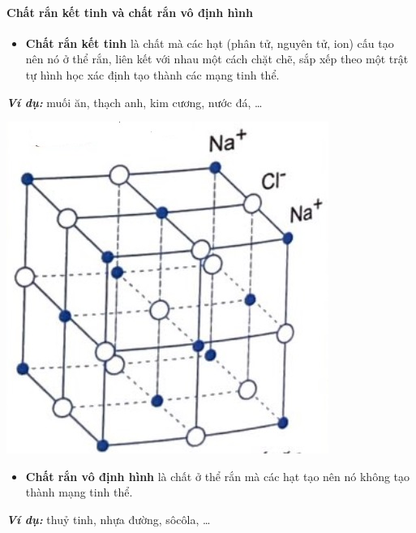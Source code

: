 \paragraph{Chất rắn kết tinh và chất rắn vô định hình}
\begin{boxdn}
	\begin{itemize}
		\item \textbf{Chất rắn kết tinh} là chất mà các hạt (phân tử, nguyên tử, ion) cấu tạo nên nó ở thể rắn, liên kết với nhau một cách chặt chẽ, sắp xếp theo một trật tự hình học xác định tạo thành các mạng tinh thể.
	\end{itemize}
\end{boxdn}
\begin{boxvidu}
\textit{\textbf{Ví dụ:}} muối ăn, thạch anh, kim cương, nước đá, \dots
\end{boxvidu}
	
	\begin{center}
		\includegraphics[width=0.2\linewidth]{figs/VN12-Y24-PH-SYL-001-3}
	\end{center}
	\begin{boxdn}
		\begin{itemize}
		\item \textbf{Chất rắn vô định hình} là chất ở thể rắn mà các hạt tạo nên nó không tạo thành mạng tinh thể.\\
	\end{itemize}
	\end{boxdn}
\begin{boxvidu}
	\textbf{\textit{Ví dụ:}} thuỷ tinh, nhựa đường, sôcôla, \dots
\end{boxvidu}
